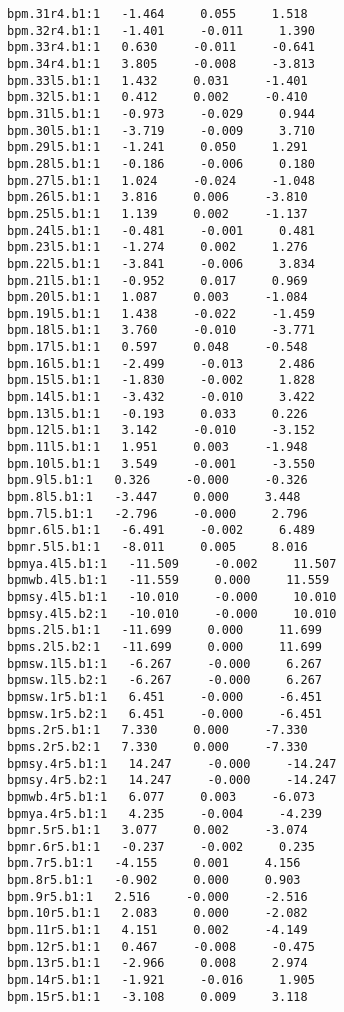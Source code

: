 \begin{verbatim}
bpm.31r4.b1:1   -1.464     0.055     1.518
bpm.32r4.b1:1   -1.401     -0.011     1.390
bpm.33r4.b1:1   0.630     -0.011     -0.641
bpm.34r4.b1:1   3.805     -0.008     -3.813
bpm.33l5.b1:1   1.432     0.031     -1.401
bpm.32l5.b1:1   0.412     0.002     -0.410
bpm.31l5.b1:1   -0.973     -0.029     0.944
bpm.30l5.b1:1   -3.719     -0.009     3.710
bpm.29l5.b1:1   -1.241     0.050     1.291
bpm.28l5.b1:1   -0.186     -0.006     0.180
bpm.27l5.b1:1   1.024     -0.024     -1.048
bpm.26l5.b1:1   3.816     0.006     -3.810
bpm.25l5.b1:1   1.139     0.002     -1.137
bpm.24l5.b1:1   -0.481     -0.001     0.481
bpm.23l5.b1:1   -1.274     0.002     1.276
bpm.22l5.b1:1   -3.841     -0.006     3.834
bpm.21l5.b1:1   -0.952     0.017     0.969
bpm.20l5.b1:1   1.087     0.003     -1.084
bpm.19l5.b1:1   1.438     -0.022     -1.459
bpm.18l5.b1:1   3.760     -0.010     -3.771
bpm.17l5.b1:1   0.597     0.048     -0.548
bpm.16l5.b1:1   -2.499     -0.013     2.486
bpm.15l5.b1:1   -1.830     -0.002     1.828
bpm.14l5.b1:1   -3.432     -0.010     3.422
bpm.13l5.b1:1   -0.193     0.033     0.226
bpm.12l5.b1:1   3.142     -0.010     -3.152
bpm.11l5.b1:1   1.951     0.003     -1.948
bpm.10l5.b1:1   3.549     -0.001     -3.550
bpm.9l5.b1:1   0.326     -0.000     -0.326
bpm.8l5.b1:1   -3.447     0.000     3.448
bpm.7l5.b1:1   -2.796     -0.000     2.796
bpmr.6l5.b1:1   -6.491     -0.002     6.489
bpmr.5l5.b1:1   -8.011     0.005     8.016
bpmya.4l5.b1:1   -11.509     -0.002     11.507
bpmwb.4l5.b1:1   -11.559     0.000     11.559
bpmsy.4l5.b1:1   -10.010     -0.000     10.010
bpmsy.4l5.b2:1   -10.010     -0.000     10.010
bpms.2l5.b1:1   -11.699     0.000     11.699
bpms.2l5.b2:1   -11.699     0.000     11.699
bpmsw.1l5.b1:1   -6.267     -0.000     6.267
bpmsw.1l5.b2:1   -6.267     -0.000     6.267
bpmsw.1r5.b1:1   6.451     -0.000     -6.451
bpmsw.1r5.b2:1   6.451     -0.000     -6.451
bpms.2r5.b1:1   7.330     0.000     -7.330
bpms.2r5.b2:1   7.330     0.000     -7.330
bpmsy.4r5.b1:1   14.247     -0.000     -14.247
bpmsy.4r5.b2:1   14.247     -0.000     -14.247
bpmwb.4r5.b1:1   6.077     0.003     -6.073
bpmya.4r5.b1:1   4.235     -0.004     -4.239
bpmr.5r5.b1:1   3.077     0.002     -3.074
bpmr.6r5.b1:1   -0.237     -0.002     0.235
bpm.7r5.b1:1   -4.155     0.001     4.156
bpm.8r5.b1:1   -0.902     0.000     0.903
bpm.9r5.b1:1   2.516     -0.000     -2.516
bpm.10r5.b1:1   2.083     0.000     -2.082
bpm.11r5.b1:1   4.151     0.002     -4.149
bpm.12r5.b1:1   0.467     -0.008     -0.475
bpm.13r5.b1:1   -2.966     0.008     2.974
bpm.14r5.b1:1   -1.921     -0.016     1.905
bpm.15r5.b1:1   -3.108     0.009     3.118

\end{verbatim}

